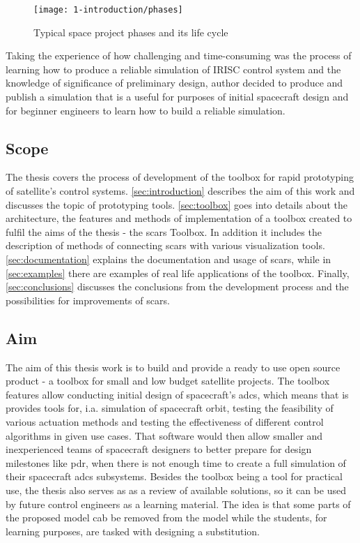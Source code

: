     \begin{figure}[H]
        \centering
        \texttt{[image: 1-introduction/phases]}
        \caption{Typical space project phases and its life cycle\cite{nguyen2000effective}}
        \label{fig:phases}
    \end{figure}

    Taking the experience of how challenging and time-consuming was the process of learning how to produce a reliable simulation of IRISC control system and the knowledge of significance of preliminary design, author decided to produce and publish a simulation that is a useful for purposes of initial spacecraft design and for beginner engineers to learn how to build a reliable simulation. 
    
\subsection{Scope}
    The thesis covers the process of development of the toolbox for rapid prototyping of satellite's control systems. \autoref{sec:introduction} describes the aim of this work and discusses the topic of prototyping tools. \autoref{sec:toolbox} goes into details about the architecture, the features and methods of implementation of a toolbox created to fulfil the aims of the thesis - the \ac{scars} Toolbox. In addition it includes the description of methods of connecting \ac{scars} with various visualization tools. \autoref{sec:documentation} explains the documentation and usage of \ac{scars}, while in \autoref{sec:examples} there are examples of real life applications of the toolbox. Finally, \autoref{sec:conclusions} discusses the conclusions from the development process and the possibilities for improvements of \ac{scars}.

\subsection{Aim}\label{sec:aim}
    The aim of this thesis work is to build and provide a ready to use open source product - a toolbox for small and low budget satellite projects.  The toolbox features allow conducting initial design of spacecraft's \ac{adcs}, which means that is provides tools for, i.a. simulation of spacecraft orbit, testing the feasibility of various actuation methods and testing the effectiveness of different control algorithms in given use cases. That software would then allow smaller and inexperienced teams of spacecraft designers to better prepare for design milestones like \ac{pdr}, when there is not enough time to create a full simulation of their spacecraft \ac{adcs} subsystems. Besides the toolbox being a tool for practical use, the thesis also serves as as a review of available solutions, so it can be used by future control engineers as a learning material. The idea is that some parts of the proposed model cab be removed from the model while the students, for learning purposes, are tasked with designing a substitution.


